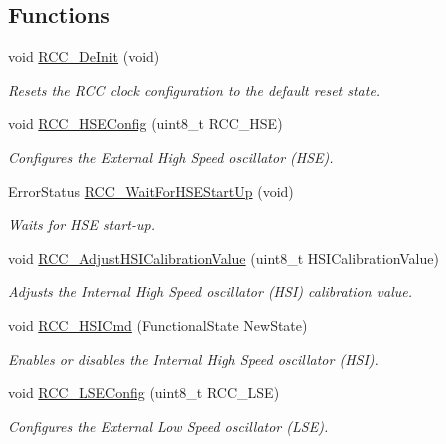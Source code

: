 \subsection*{Functions}
\begin{DoxyCompactItemize}
\item 
void \hyperlink{group___r_c_c_ga413f6422be11b1334abe60b3bff2e062}{R\+C\+C\+\_\+\+De\+Init} (void)
\begin{DoxyCompactList}\small\item\em Resets the R\+CC clock configuration to the default reset state. \end{DoxyCompactList}\item 
void \hyperlink{group___r_c_c_ga523b06e73f6aa8a03e42299c855066a8}{R\+C\+C\+\_\+\+H\+S\+E\+Config} (uint8\+\_\+t R\+C\+C\+\_\+\+H\+SE)
\begin{DoxyCompactList}\small\item\em Configures the External High Speed oscillator (H\+SE). \end{DoxyCompactList}\item 
Error\+Status \hyperlink{group___r_c_c_gae0f15692614dd048ee4110a056f001dc}{R\+C\+C\+\_\+\+Wait\+For\+H\+S\+E\+Start\+Up} (void)
\begin{DoxyCompactList}\small\item\em Waits for H\+SE start-\/up. \end{DoxyCompactList}\item 
void \hyperlink{group___r_c_c_gaa2d6a35f5c2e0f86317c3beb222677fc}{R\+C\+C\+\_\+\+Adjust\+H\+S\+I\+Calibration\+Value} (uint8\+\_\+t H\+S\+I\+Calibration\+Value)
\begin{DoxyCompactList}\small\item\em Adjusts the Internal High Speed oscillator (H\+SI) calibration value. \end{DoxyCompactList}\item 
void \hyperlink{group___r_c_c_ga0c6772a1e43765909495f57815ef69e2}{R\+C\+C\+\_\+\+H\+S\+I\+Cmd} (Functional\+State New\+State)
\begin{DoxyCompactList}\small\item\em Enables or disables the Internal High Speed oscillator (H\+SI). \end{DoxyCompactList}\item 
void \hyperlink{group___r_c_c_ga65209ab5c3589b249c7d70f978735ca6}{R\+C\+C\+\_\+\+L\+S\+E\+Config} (uint8\+\_\+t R\+C\+C\+\_\+\+L\+SE)
\begin{DoxyCompactList}\small\item\em Configures the External Low Speed oscillator (L\+SE). \end{DoxyCompactList}\item 

\end{DoxyCompactItemize}
